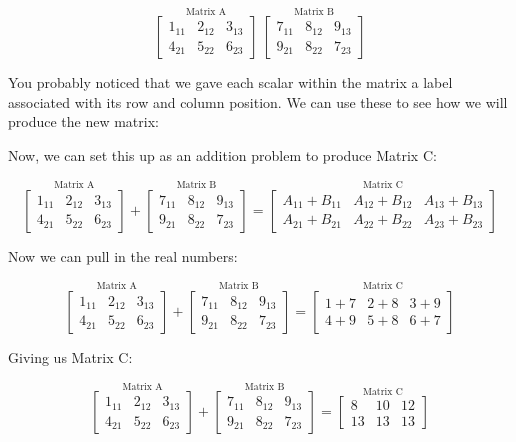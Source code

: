 \documentclass[
  letterpaper,
]{krantz}
\begin{document}
\[
\stackrel{\mbox{Matrix A}}{
\begin{bmatrix}
1_{11} & 2_{12} & 3_{13}\\
4_{21} & 5_{22} & 6_{23}
\end{bmatrix}
}  
\ 
\stackrel{\mbox{Matrix B}}{
\begin{bmatrix}
7_{11} & 8_{12} & 9_{13}\\
9_{21} & 8_{22} & 7_{23}
\end{bmatrix} 
}
\]

You probably noticed that we gave each scalar within the matrix a label
associated with its row and column position. We can use these to see how
we will produce the new matrix:

Now, we can set this up as an addition problem to produce Matrix C:

\[
\stackrel{\mbox{Matrix A}}{
\begin{bmatrix}
1_{11} & 2_{12} & 3_{13}\\
4_{21} & 5_{22} & 6_{23}
\end{bmatrix}
}  
+ 
\stackrel{\mbox{Matrix B}}{
\begin{bmatrix}
7_{11} & 8_{12} & 9_{13}\\
9_{21} & 8_{22} & 7_{23}
\end{bmatrix} 
}
=
\stackrel{\mbox{Matrix C}}{
\begin{bmatrix}
A_{11} + B_{11}& A_{12} + B_{12} & A_{13} + B_{13}\\
A_{21} + B_{21}& A_{22} + B_{22} & A_{23} + B_{23}
\end{bmatrix}
}
\]

Now we can pull in the real numbers:

\[
\stackrel{\mbox{Matrix A}}{
\begin{bmatrix}
1_{11} & 2_{12} & 3_{13}\\
4_{21} & 5_{22} & 6_{23}
\end{bmatrix}
}  
+ 
\stackrel{\mbox{Matrix B}}{
\begin{bmatrix}
7_{11} & 8_{12} & 9_{13}\\
9_{21} & 8_{22} & 7_{23}
\end{bmatrix} 
}
=
\stackrel{\mbox{Matrix C}}{
\begin{bmatrix}
1 + 7  & 2 + 8 & 3 + 9\\
4 + 9 & 5 + 8 & 6 + 7
\end{bmatrix}
}
\]

Giving us Matrix C:

\[
\stackrel{\mbox{Matrix A}}{
\begin{bmatrix}
1_{11} & 2_{12} & 3_{13}\\
4_{21} & 5_{22} & 6_{23}
\end{bmatrix}
}  
+ 
\stackrel{\mbox{Matrix B}}{
\begin{bmatrix}
7_{11} & 8_{12} & 9_{13}\\
9_{21} & 8_{22} & 7_{23}
\end{bmatrix} 
}
=
\stackrel{\mbox{Matrix C}}{
\begin{bmatrix}
8 & 10 & 12 \\
13 & 13 & 13
\end{bmatrix}
}
\]
\end{document}
